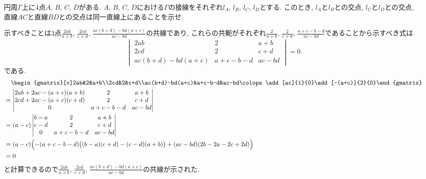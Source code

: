 \begin{bprb}
円周$\Gamma$上に$4$点$A$, $B$, $C$, $D$がある.
$A$, $B$, $C$, $D$における$\Gamma$の接線をそれぞれ$l_A$, $l_B$, $l_C$, $l_D$とする.
このとき, $l_A$と$l_B$との交点, $l_C$と$l_D$との交点, 直線$AC$と直線$BD$との交点は同一直線上にあることを示せ.
\end{bprb}
\begin{ifsol*}
示すべきことは$3$点$\frac{2ab}{a+b}$, $\frac{2cd}{c+d}$, $\frac{ac(b+d)-bd(a+c)}{ac-bd}$の共線であり, これらの共軛がそれぞれ$\frac{2}{a+b}$, $\frac{2}{c+d}$, $\frac{a+c-b-d}{ac-bd}$であることから示すべき式は
\[\begin{vmatrix}2ab&2&a+b\\2cd&2&c+d\\ac(b+d)-bd(a+c)&a+c-b-d&ac-bd\end{vmatrix}=0\]
である.
\begin{align*}
&\phantom{={}}\begin{gmatrix}[v]2ab&2&a+b\\2cd&2&c+d\\ac(b+d)-bd(a+c)&a+c-b-d&ac-bd\colops\add[ac]{1}{0}\add[-(a+c)]{2}{0}\end{gmatrix}\\
&=\begin{vmatrix}2ab+2ac-(a+c)(a+b)&2&a+b\\2cd+2ac-(a+c)(c+d)&2&c+d\\0&a+c-b-d&ac-bd\end{vmatrix}\\
&=(a-c)\begin{vmatrix}b-a&2&a+b\\c-d&2&c+d\\0&a+c-b-d&ac-bd\end{vmatrix}\\
&=(a-c)\Bigl(-(a+c-b-d)\bigl((b-a)(c+d)-(c-d)(a+b)\bigr)+(ac-bd)(2b-2a-2c+2d)\Bigr)\\
&=0
\end{align*}
と計算できるので$\frac{2ab}{a+b}$, $\frac{2cd}{c+d}$, $\frac{ac(b+d)-bd(a+c)}{ac-bd}$の共線が示された.
\end{ifsol*}